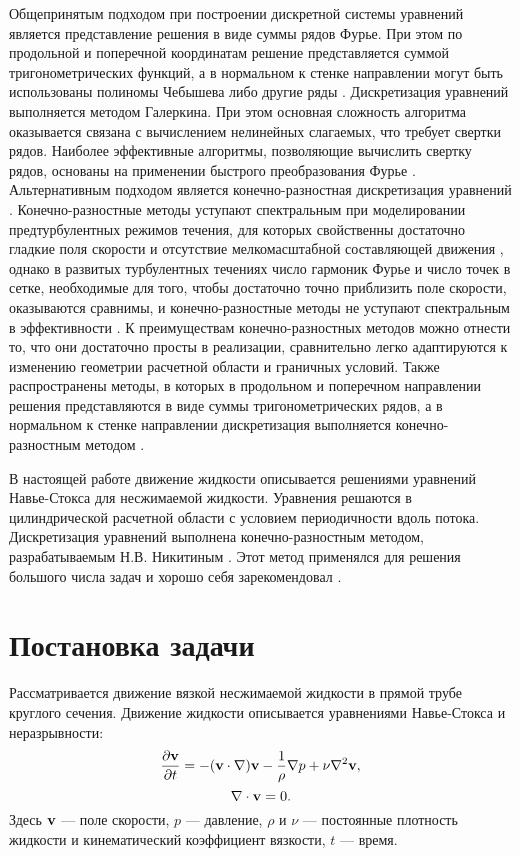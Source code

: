 Общепринятым подходом при построении дискретной системы уравнений является представление решения в виде суммы рядов Фурье. При этом по продольной и поперечной координатам решение представляется суммой тригонометрических функций, а в нормальном к стенке направлении могут быть использованы полиномы Чебышева либо другие ряды \cite{Orszag1971b, Meseguer2007}. Дискретизация уравнений выполняется методом Галеркина. При этом основная сложность алгоритма оказывается связана с вычислением нелинейных слагаемых, что требует свертки рядов. Наиболее эффективные алгоритмы, позволяющие вычислить свертку рядов, основаны на применении быстрого преобразования Фурье \cite{Cooley1965}. Альтернативным подходом является конечно-разностная дискретизация уравнений \cite{Nikitin2006}. Конечно-разностные методы уступают спектральным при моделировании предтурбулентных режимов течения, для которых свойственны достаточно гладкие поля скорости и отсутствие мелкомасштабной составляющей движения \cite{Orszag1971a}, однако в развитых турбулентных течениях число гармоник Фурье и число точек в сетке, необходимые для того, чтобы достаточно точно приблизить поле скорости, оказываются сравнимы, и конечно-разностные методы не уступают спектральным в эффективности \cite{Rai1991}. К преимуществам конечно-разностных методов можно отнести то, что они достаточно просты в реализации, сравнительно легко адаптируются к изменению геометрии расчетной области и граничных условий. Также распространены методы, в которых в продольном и поперечном направлении решения представляются в виде суммы тригонометрических рядов, а в нормальном к стенке направлении дискретизация выполняется конечно-разностным методом \cite{Nikitin1994a}.

В настоящей работе движение жидкости описывается решениями уравнений Навье-Стокса для несжимаемой жидкости. Уравнения решаются в цилиндрической расчетной области с условием периодичности вдоль потока. Дискретизация уравнений выполнена конечно-разностным методом, разрабатываемым Н.В. Никитиным \cite{Nikitin2006}. Этот метод применялся для решения большого числа задач и хорошо себя зарекомендовал \cite{Yakhot2006a, Yakhot2006b, Holzner2008, Demekhin2013}. 

\section{Постановка задачи} \label{math_section}

Рассматривается движение вязкой несжимаемой жидкости в прямой трубе круглого сечения. Движение жидкости описывается уравнениями Навье-Стокса и неразрывности:
\begin{equation} \label{NS_eq}
\frac{\partial \mathbf{v}}{\partial t} = - (\mathbf{v} \cdot \nabla) \mathbf{v} - \frac{1}{\rho}\nabla p + \nu \nabla^2 \mathbf{v},
\end{equation}
\begin{equation} \label{div_eq}
\nabla \cdot \mathbf{v} = 0.
\end{equation}
Здесь $\mathbf{v}$ --- поле скорости, $p$ --- давление, $\rho$ и $\nu$ --- постоянные плотность жидкости и кинематический коэффициент вязкости, $t$ --- время. 

